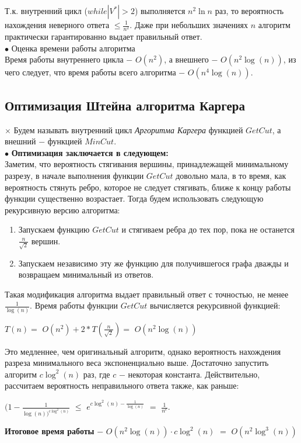         Т.к. внутренний цикл ($while |V^*| > 2$) выполняется $n^2\ln{n}$ раз, то вероятность нахождения неверного ответа $\leq \frac{1}{n^2}$. Даже при небольших значениях $n$ алгоритм практически гарантированно выдает правильный ответ.\\

        $\bullet$ Оценка времени работы алгоритма\\
        Время работы внутреннего цикла $-$ $O(n^2)$, а внешнего $-$ $O(n^2\log(n))$, из чего следует, что время работы всего алгоритма $-$ $O(n^4\log(n))$.
        
        
        
    \subsection{Оптимизация Штейна алгоритма Каргера}
        $\times$ Будем называть внутренний цикл \textit{Аргоритма Каргера} функцией $GetCut$, а внешний $-$ функцией $MinCut$.\\

        $\bullet$ \textbf{Оптимизация заключается в следующем:}\\
        Заметим, что вероятность стягивания вершины, принадлежащей минимальному разрезу, в начале выполнения функции $GetCut$ довольно мала, в то время, как вероятность стянуть ребро, которое не следует стягивать, ближе к концу работы функции существенно возрастает. Тогда будем использовать следующую рекурсивную версию алгоритма:
        \begin{enumerate}
            \item Запускаем функцию $GetCut$ и стягиваем ребра до тех пор, пока не останется $\frac{n}{\sqrt{2}}$  вершин.
            \item Запускаем независимо эту же функцию для получившегося графа дважды и возвращаем минимальный из ответов.
        \end{enumerate}
        Такая модификация алгоритма выдает правильный ответ с точностью, не менее $\frac{1}{\log(n)}$. Время работы функции $GetCut$ вычисляется рекурсивной функцией:
        \begin{center}
            $T(n) =$ $O(n^2) + 2* T(\frac{n}{\sqrt{2}}) =$ $O(n^2\log(n))$
        \end{center}
        
        Это медленнее, чем оригинальный алгоритм, однако вероятность нахождения разреза минимального веса экспоненциально выше. Достаточно запустить алгоритм $c\log^2(n)$ раз, где $c$ $-$ некоторая константа. Действительно, рассчитаем вероятность неправильного ответа также, как раньше:
        \begin{center}
            $(1 - \frac{1}{\log(n))^{c\log^2(n)}}$ $\leq$ $e^{c\log^2(n) - \frac{1}{\log(n)}}$ $=$ $\frac{1}{n^c}$.
        \end{center}
        \textbf{Итоговое время работы} $-$ $O(n^2\log(n)) \cdot c\log^2(n)$ $=$ $O(n^2\log^3(n))$
        
